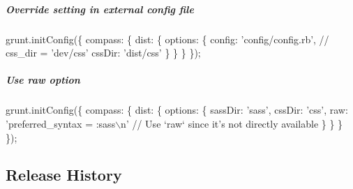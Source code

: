 \subparagraph*{Override setting in external config file}


\begin{DoxyCode}
grunt.initConfig(\{
  compass: \{
    dist: \{
      options: \{
        config: 'config/config.rb',  // css\_dir = 'dev/css'
        cssDir: 'dist/css'
      \}
    \}
  \}
\});
\end{DoxyCode}


\subparagraph*{Use {\ttfamily raw} option}


\begin{DoxyCode}
grunt.initConfig(\{
  compass: \{
    dist: \{
      options: \{
        sassDir: 'sass',
        cssDir: 'css',
        raw: 'preferred\_syntax = :sass\(\backslash\)n' // Use `raw` since it's not directly available
      \}
    \}
  \}
\});
\end{DoxyCode}


\subsection*{Release History}


